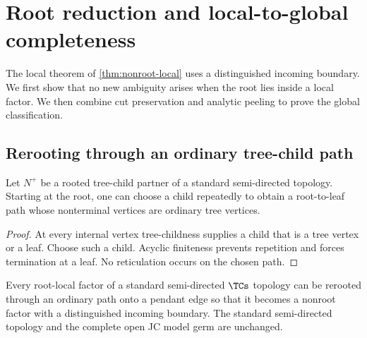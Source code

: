 \section{Root reduction and local-to-global completeness}\label{sec:global}

The local theorem of \cref{thm:nonroot-local} uses a distinguished incoming boundary.  We first show that no new ambiguity arises when the root lies inside a local factor.  We then combine cut preservation and analytic peeling to prove the global classification.

\subsection{Rerooting through an ordinary tree-child path}

\begin{lemma}\label{lem:ordinary-path}
Let $N^+$ be a rooted tree-child partner of a standard semi-directed topology.  Starting at the root, one can choose a child repeatedly to obtain a root-to-leaf path whose nonterminal vertices are ordinary tree vertices.
\end{lemma}

\begin{proof}
At every internal vertex tree-childness supplies a child that is a tree vertex or a leaf.  Choose such a child.  Acyclic finiteness prevents repetition and forces termination at a leaf.  No reticulation occurs on the chosen path.
\end{proof}

\begin{theorem}\label{thm:root-reduction}
Every root-local factor of a standard semi-directed $\TCs$ topology can be rerooted through an ordinary path onto a pendant edge so that it becomes a nonroot factor with a distinguished incoming boundary.  The standard semi-directed topology and the complete open JC model germ are unchanged.
\end{theorem}

